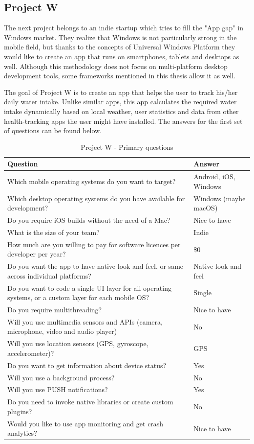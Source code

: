 \documentclass[english,master,public,dept460,male,cpdeclaration,oneside]{diploma}
\begin{document}
\subsection{Project W}

The next project belongs to an indie startup which tries to fill the "App gap" in Windows market. They realize that Windows is not particularly strong in the mobile field, but thanks to the concepts of Universal Windows Platform they would like to create an app that runs on smartphones, tablets and desktops as well. Although this methodology does not focus on multi-platform desktop development tools, some frameworks mentioned in this thesis allow it as well.

The goal of Project W is to create an app that helps the user to track his/her daily water intake. Unlike similar apps, this app calculates the required water intake dynamically based on local weather, user statistics and data from other health-tracking apps the user might have installed. The answers for the first set of questions can be found below.

\begin{table}[!h]
	\centering
	\caption{Project W - Primary questions}
	\begin{tabular}{p{7.5cm} | p{5cm}}
		\toprule		
		\textbf{Question} &	\textbf{Answer}\\
		\midrule
		Which mobile operating systems do you want to target? &	Android, iOS, Windows \\
		Which desktop operating systems do you have available for development? & Windows (maybe macOS) \\
		Do you require iOS builds without the need of a Mac? & Nice to have \\
		What is the size of your team? & Indie \\
		How much are you willing to pay for software licences per developer per year? & \$0 \\
		Do you want the app to have native look and feel, or same across individual platforms? & Native look and feel \\
		Do you want to code a single UI layer for all operating systems, or a custom layer for each mobile OS? & Single \\
		Do you require multithreading? & Nice to have \\
		Will you use multimedia sensors and APIs (camera, microphone, video and audio player) & No  \\
		Will you use location sensors (GPS, gyroscope, accelerometer)? & GPS \\
		Do you want to get information about device status? & Yes \\
		Will you use a background process? & No \\
		Will you use PUSH notifications? & Yes \\
		Do you need to invoke native libraries or create custom plugins? & No \\
		Would you like to use app monitoring and get crash analytics? & Nice to have \\		
		\midrule
	\end{tabular}
\end{table}
\end{document}
